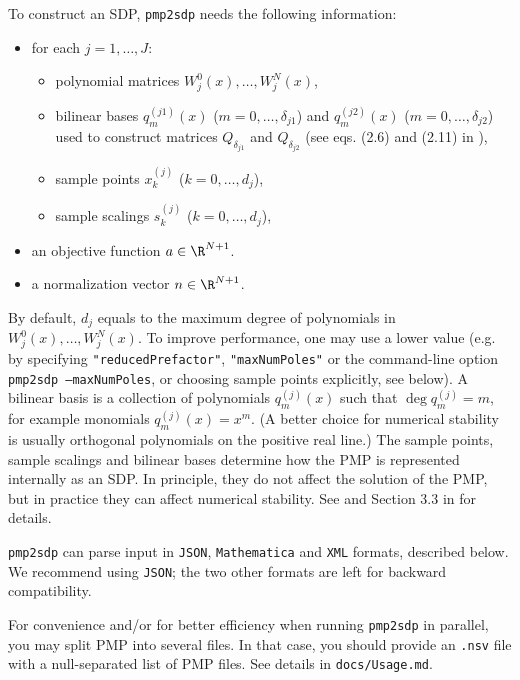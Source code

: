 \documentclass[12pt]{article}
\numberwithin{equation}{section}
\begin{document}
To construct an SDP, \texttt{pmp2sdp} needs the following information:
\begin{itemize}
	\item for each $j=1,\dots,J$:
	\begin{itemize}
		\item polynomial matrices $W^0_j(x),\dots,W^N_j(x)$,
		\item bilinear bases $q_m^{(j1)}(x)$ ($m=0,\dots,\delta_{j1}$) 
			and $q_m^{(j2)}(x)$ ($m=0,\dots,\delta_{j2}$)
			used to construct matrices $Q_{\delta_{j1}}$ and $Q_{\delta_{j2}}$
			(see eqs. (2.6) and (2.11) in \cite{DSD}),
		\item sample points $x_k^{(j)}$ ($k=0,\dots,d_j$),
		\item sample scalings $s_k^{(j)}$ ($k=0,\dots,d_j$),
	\end{itemize}
	\item an objective function $a\in \R^{N+1}$.
	\item a normalization vector $n\in \R^{N+1}$.
\end{itemize}
By default, $d_j$ equals to the maximum degree of polynomials in $W^0_j(x),\dots,W^N_j(x)$.
To improve performance, one may use a lower value (e.g. by specifying \texttt{"reducedPrefactor"}, \texttt{"maxNumPoles"} or the command-line option \texttt{pmp2sdp --maxNumPoles}, or choosing sample points explicitly, see below).
A bilinear basis is a collection of polynomials $q_m^{(j)}(x)$ such that $\deg q_m^{(j)} = m$, for example monomials $q_m^{(j)}(x)=x^m$.  (A better choice for numerical stability is usually orthogonal polynomials on the positive real line.)  The sample points, sample scalings and bilinear bases determine how the PMP is represented internally as an SDP.  In principle, they do not affect the solution of the PMP, but in practice they can affect numerical stability.
See \cite{Chang:2025mwt} and Section 3.3 in \cite{DSD} for details.


\texttt{pmp2sdp} can parse input in \texttt{JSON}, \texttt{Mathematica} and \texttt{XML} formats, described below.
We recommend using \texttt{JSON}; the two other formats are left for backward compatibility.

For convenience and/or for better efficiency when running \texttt{pmp2sdp} in parallel,
you may split PMP into several files.
In that case, you should provide an \texttt{.nsv} file with a null-separated list of PMP files.
See details in \texttt{docs/Usage.md}.
\end{document}
